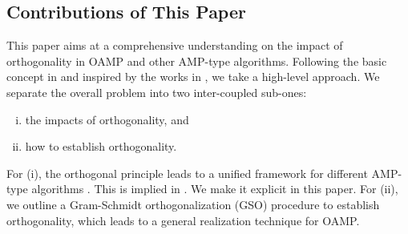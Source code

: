 \documentclass[journal]{IEEEtran}
\newcommand{\JMC}[1]{\textcolor{magenta}{#1}}
\begin{document}

{\color{black}\subsection{Contributions of This Paper}
This paper aims at a comprehensive understanding on the impact of orthogonality in OAMP and other AMP-type algorithms. Following the basic concept in \cite{Ma2016} and inspired by the works in \cite{Rangan2016, Takeuchi2019}, we take a high-level approach. We separate the overall problem into two inter-coupled sub-ones: 
\begin{enumerate}[(i)]
    \item the impacts of orthogonality, and
    \item how to establish orthogonality.
\end{enumerate} 
For (i), the orthogonal principle leads to a unified framework for different AMP-type algorithms \cite{ Donoho2009, Ma2016, Rangan2016, Takeuchi2017, Bayati2011, Takeuchi2019}. This is implied in \cite{Takeuchi2019}. We make it explicit in this paper. For (ii), we outline a Gram-Schmidt orthogonalization (GSO) procedure to establish orthogonality, which leads to a general realization technique for OAMP. 

}
\end{document}
